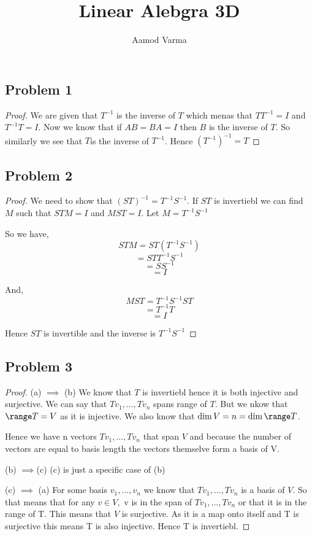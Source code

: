 \documentclass[a4paper]{report}
\title{Linear Alebgra 3D}
\author{Aamod Varma}
\begin{document}
\maketitle
\date{}


\subsection*{Problem 1}
\begin{proof}
    We are given that $T^{-1}$ is the inverse of $T$ which menas that $TT^{-1} = I$ and $T^{-1}T = I$. Now we know that if $AB = BA = I$ then $B$ is the inverse of $T$. So similarly we see that $T$is the inverse of $T^{-1}$. Hence $(T^{-1})^{-1} = T$
\end{proof}
\subsection*{Problem 2}

\begin{proof}
   We need to show that $(ST)^{-1} = T^{-1}S^{-1}$. If $ST$ is invertiebl  we can find $M$ such that $STM =I$ and $MST = I$. Let  $M =T^{-1}S^{-1} $

   So we have, 
   $$ STM = ST(T^{-1}S^{-1}) $$ 
   $$ = STT^{-1}S^{-1} $$ 
   $$ = SS^{-1} $$ 
   $$ = I $$ 

   And, 
   $$ MST = T^{-1}S^{-1}ST $$ 
   $$ = T^{-1}T $$ 
   $$ =I $$ 

   Hence $ST$ is invertible and the inverse is  $T^{-1}S^{-1}$


\end{proof}



\subsection*{Problem 3}
\begin{proof}
    (a) $\implies$ (b)
    We know that $T$ is invertiebl hence it is both injective and surjective. We can say that $Tv_1,\dots,Tv_n$ spans range of $T$. But we nkow that $\range T = V$ as it is injective. We also know that $\dim V = n = \dim \range T$. 

    Hence we have n vectors $Tv_1,\dots,Tv_n$ that span $V$ and because the number of vectors are equal to basis length the vectors themselve form a basis of V.

    (b) $\implies $(c) 
    (c) is just a specific case of (b)

    (c) $\implies$ (a)
    For some basis $v_1,\dots,v_n$ we know that $Tv_1,\dots,Tv_n$ is a basis of $V$. So that means that for any $v \in V,$  v is in the span of $Tv_1,\dots,Tv_n$ or that it is in the range of T. This means that $V$ is surjective. As it is a map onto itself and T is surjective this means T is also injective. Hence T is invertiebl.
\end{proof}
\end{document}
